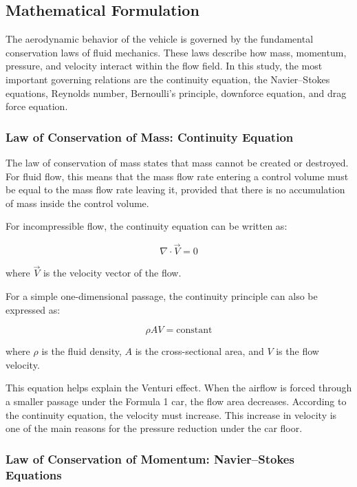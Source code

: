 \documentclass[12pt,a4paper]{article}
\begin{document}
\subsection{Mathematical Formulation}

The aerodynamic behavior of the vehicle is governed by the fundamental conservation
laws of fluid mechanics. These laws describe how mass, momentum, pressure, and velocity
interact within the flow field. In this study, the most important governing relations are
the continuity equation, the Navier--Stokes equations, Reynolds number, Bernoulli's
principle, downforce equation, and drag force equation.

\subsubsection{Law of Conservation of Mass: Continuity Equation}

The law of conservation of mass states that mass cannot be created or destroyed. For
fluid flow, this means that the mass flow rate entering a control volume must be equal
to the mass flow rate leaving it, provided that there is no accumulation of mass inside
the control volume.

For incompressible flow, the continuity equation can be written as:

\begin{equation}
    \nabla \cdot \vec{V} = 0
    \label{eq:continuity_vector}
\end{equation}

where $\vec{V}$ is the velocity vector of the flow.

For a simple one-dimensional passage, the continuity principle can also be expressed as:

\begin{equation}
    \rho A V = \text{constant}
    \label{eq:continuity_1d}
\end{equation}

where $\rho$ is the fluid density, $A$ is the cross-sectional area, and $V$ is the flow
velocity.

This equation helps explain the Venturi effect. When the airflow is forced through a
smaller passage under the Formula 1 car, the flow area decreases. According to the
continuity equation, the velocity must increase. This increase in velocity is one of the
main reasons for the pressure reduction under the car floor.

\subsubsection{Law of Conservation of Momentum: Navier--Stokes Equations}
\end{document}
